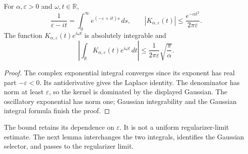 \begin{lemma}
    \label{lem:hk_gaussian_cauchy_integrability}
    \leanok
    For $\alpha,\varepsilon>0$ and $\omega,t\in\mathbb R$,
    \[
        \frac1{\varepsilon-it}
        =\int_0^\infty e^{(-\varepsilon+it)s}\,ds,
        \qquad
        |K_{\alpha,\varepsilon}(t)|
        \le\frac{e^{-\alpha t^2}}{2\pi\varepsilon}.
    \]
    The function $K_{\alpha,\varepsilon}(t)e^{i\omega t}$ is absolutely
    integrable and
    \[
        \left|\int_{\mathbb R}
        K_{\alpha,\varepsilon}(t)e^{i\omega t}\,dt\right|
        \le \frac1{2\pi\varepsilon}\sqrt{\frac\pi\alpha}.
    \]
\end{lemma}
\begin{proof}\leanok
    The complex exponential integral converges since its exponent has
    real part $-\varepsilon<0$. Its antiderivative gives the Laplace
    identity. The denominator has norm at least $\varepsilon$, so
    the kernel is dominated by the displayed Gaussian. The oscillatory
    exponential has norm one; Gaussian integrability and the Gaussian
    integral formula finish the proof.
\end{proof}

The bound retains its dependence on $\varepsilon$. It is not a uniform
regularizer-limit estimate. The next lemma interchanges the two integrals,
identifies the Gaussian selector, and passes to the regularizer limit.

